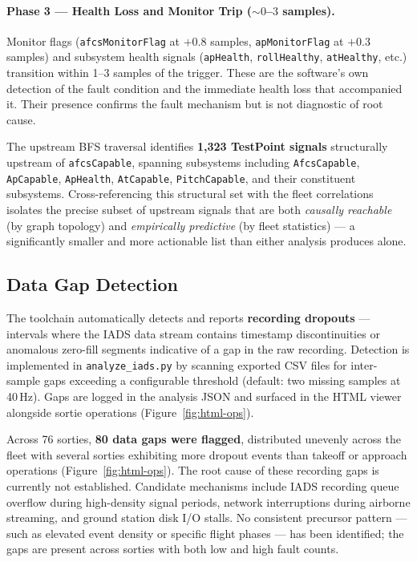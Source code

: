 \documentclass[11pt, letterpaper]{article}
\begin{document}
\paragraph{Phase 3 --- Health Loss and Monitor Trip ($\sim\!0$--$3$ samples).}
Monitor flags (\texttt{afcsMonitorFlag} at $+0.8$ samples, \texttt{apMonitorFlag}
at $+0.3$ samples) and subsystem health signals (\texttt{apHealth},
\texttt{rollHealthy}, \texttt{atHealthy}, etc.) transition within 1--3 samples
of the trigger. These are the software's own detection of the fault condition
and the immediate health loss that accompanied it. Their presence confirms the
fault mechanism but is not diagnostic of root cause.

\medskip
The upstream BFS traversal identifies \textbf{1{,}323 TestPoint signals}
structurally upstream of \texttt{afcsCapable}, spanning subsystems including
\texttt{AfcsCapable}, \texttt{ApCapable}, \texttt{ApHealth}, \texttt{AtCapable},
\texttt{PitchCapable}, and their constituent subsystems. Cross-referencing
this structural set with the fleet correlations isolates the precise subset of
upstream signals that are both \emph{causally reachable} (by graph topology)
and \emph{empirically predictive} (by fleet statistics) --- a significantly
smaller and more actionable list than either analysis produces alone.

\subsection{Data Gap Detection}

The toolchain automatically detects and reports \textbf{recording dropouts} ---
intervals where the IADS data stream contains timestamp discontinuities or
anomalous zero-fill segments indicative of a gap in the raw recording.
Detection is implemented in \texttt{analyze\_iads.py} by scanning exported CSV
files for inter-sample gaps exceeding a configurable threshold (default: two
missing samples at 40\,Hz). Gaps are logged in the analysis JSON and surfaced in
the HTML viewer alongside sortie operations (Figure~\ref{fig:html-ops}).

Across 76 sorties, \textbf{80 data gaps were flagged}, distributed unevenly
across the fleet with several sorties exhibiting more dropout events than
takeoff or approach operations (Figure~\ref{fig:html-ops}). The root cause of
these recording gaps is currently not established. Candidate mechanisms include
IADS recording queue overflow during high-density signal periods, network
interruptions during airborne streaming, and ground station disk I/O stalls.
No consistent precursor pattern --- such as elevated event density or specific
flight phases --- has been identified; the gaps are present across sorties with
both low and high fault counts.
\end{document}
